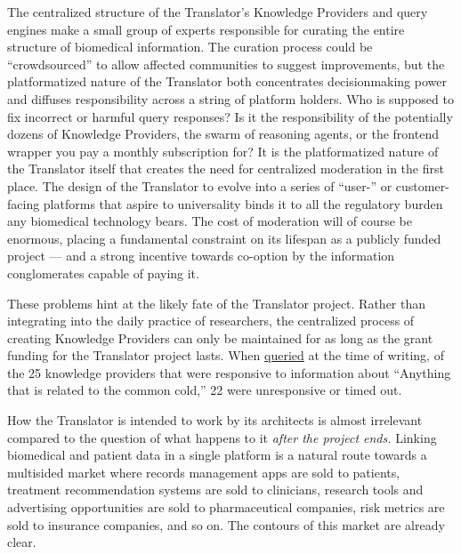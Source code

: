 The centralized structure of the Translator's Knowledge Providers and
query engines make a small group of experts responsible for curating the
entire structure of biomedical information. The curation process could
be ``crowdsourced'' to allow affected communities to suggest
improvements, but the platformatized nature of the Translator both
concentrates decisionmaking power and diffuses responsibility across a
string of platform holders. Who is supposed to fix incorrect or harmful
query responses? Is it the responsibility of the potentially dozens of
Knowledge Providers, the swarm of reasoning agents, or the frontend
wrapper you pay a monthly subscription for? It is the platformatized
nature of the Translator itself that creates the need for centralized
moderation in the first place. The design of the Translator to evolve
into a series of ``user-'' or customer-facing platforms that aspire to
universality binds it to all the regulatory burden any biomedical
technology bears. The cost of moderation will of course be enormous,
placing a fundamental constraint on its lifespan as a publicly funded
project --- and a strong incentive towards co-option by the information
conglomerates capable of paying it.

These problems hint at the likely fate of the Translator project. Rather
than integrating into the daily practice of researchers, the centralized
process of creating Knowledge Providers can only be maintained for as
long as the grant funding for the Translator project lasts. When
\href{https://arax.rtx.ai}{queried} at the time of writing, of the 25
knowledge providers that were responsive to information about ``Anything
that is related to the common cold,'' 22 were unresponsive or timed out.

How the Translator is intended to work by its architects is almost
irrelevant compared to the question of what happens to it \emph{after
the project ends.} Linking biomedical and patient data in a single
platform is a natural route towards a multisided market where records
management apps are sold to patients, treatment recommendation systems
are sold to clinicians, research tools and advertising opportunities are
sold to pharmaceutical companies, risk metrics are sold to insurance
companies, and so on. The contours of this market are already clear.

